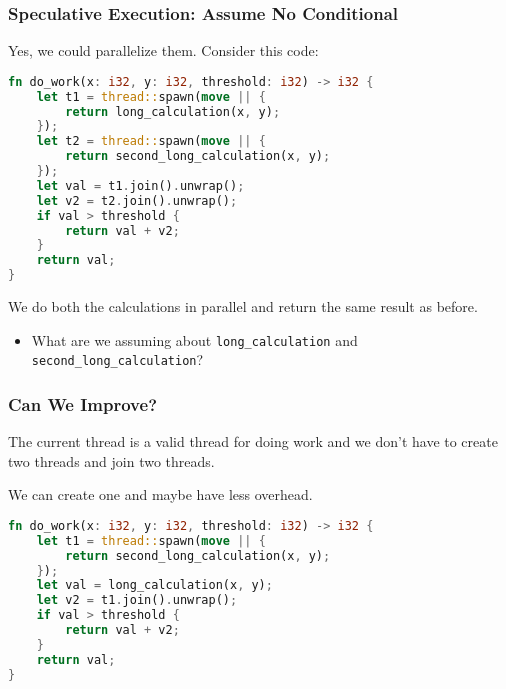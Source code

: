 \begin{frame}[fragile]
  \frametitle{Speculative Execution: Assume No Conditional}

  
  Yes, we could parallelize them. Consider this code:
    
\begin{lstlisting}[language=Rust]
fn do_work(x: i32, y: i32, threshold: i32) -> i32 {
    let t1 = thread::spawn(move || {
        return long_calculation(x, y);
    });
    let t2 = thread::spawn(move || {
        return second_long_calculation(x, y);
    });
    let val = t1.join().unwrap();
    let v2 = t2.join().unwrap();
    if val > threshold {
        return val + v2;
    }
    return val;
}
\end{lstlisting}

  We do both the calculations in parallel and return the same result as before.
  
    \begin{itemize}
    \item What are we assuming about {\tt long\_calculation} and
{\tt second\_long\_calculation}?
  \end{itemize}


\end{frame}

\begin{frame}[fragile]
\frametitle{Can We Improve?}

The current thread is a valid thread for doing work and we don't have to create two threads and join two threads. 

We can create one and maybe have less overhead.

\begin{lstlisting}[language=Rust]
fn do_work(x: i32, y: i32, threshold: i32) -> i32 {
    let t1 = thread::spawn(move || {
        return second_long_calculation(x, y);
    });
    let val = long_calculation(x, y);
    let v2 = t1.join().unwrap();
    if val > threshold {
        return val + v2;
    }
    return val;
}
\end{lstlisting}


\end{frame}

